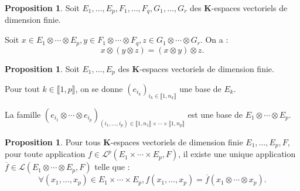 \documentclass[12pt,a4paper]{article}
\theoremstyle{definition}
\newtheorem{prop}[thm]{Proposition}
\begin{document}
\newpage
\begin{prop}
Soit $E_1,\ldots,E_p,F_1,\ldots,F_q,G_1,\ldots,G_r$ des $\mathbf{K}$-espaces vectoriels de dimension finie.

Soit $x\in E_1\otimes\cdots\otimes E_p,y\in F_1\otimes\cdots\otimes F_q,z\in G_1\otimes \cdots\otimes G_r$. On a :
$$x\otimes (y\otimes z)=(x\otimes y)\otimes z.$$
\end{prop}
\begin{prop}
Soit $E_1,\ldots,E_p$ des $\mathbf{K}$-espaces vectoriels de dimension finie.

Pour tout $k\in\llbracket 1,p\rrbracket$, on se donne $(e_{i_k})_{i_k\in\llbracket 1,n_k\rrbracket}$ une base de $E_k$.

La famille $\left(e_{i_1}\otimes\cdots\otimes e_{i_p}\right)_{(i_1,\ldots,i_p)\in\llbracket 1,n_1\rrbracket\times\cdots\times\llbracket 1,n_p\rrbracket}$ est une base de $E_1\otimes\cdots\otimes E_p$.
\end{prop}
\begin{prop}
Pour tous $\mathbf{K}$-espaces vectoriels de dimension finie $E_1,\ldots,E_p,F$, pour toute application $f\in\mathcal{L}^p\left(E_1\times\cdots\times E_p,F\right)$, il existe une unique application $\overline{f}\in\mathcal{L}\left(E_1\otimes\cdots\otimes E_p,F\right)$ telle que :
$$\forall (x_1,\ldots,x_p)\in E_1\times\cdots\times E_p, f(x_1,\ldots,x_p)=\overline{f}(x_1\otimes\cdots\otimes x_p).$$
\end{prop}
\end{document}
